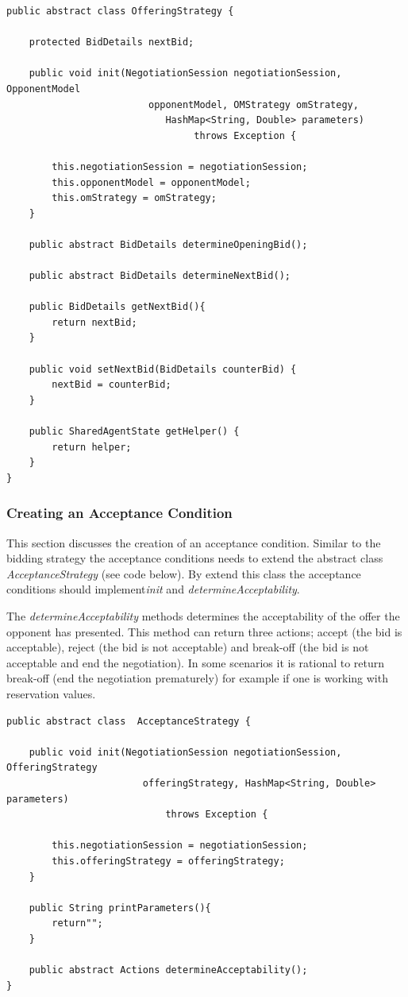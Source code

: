 \documentclass[]{article}
\begin{document}
\begin{lstlisting}
public abstract class OfferingStrategy { 

	protected BidDetails nextBid;

	public void init(NegotiationSession negotiationSession, OpponentModel
						 opponentModel, OMStrategy omStrategy, 
							HashMap<String, Double> parameters)
								 throws Exception {

		this.negotiationSession = negotiationSession;
		this.opponentModel = opponentModel;
		this.omStrategy = omStrategy;
	}
	
	public abstract BidDetails determineOpeningBid();

	public abstract BidDetails determineNextBid();	
	
	public BidDetails getNextBid(){
		return nextBid;
	}
	
	public void setNextBid(BidDetails counterBid) {
		nextBid = counterBid;
	}
	
	public SharedAgentState getHelper() {
		return helper;
	}
}
\end{lstlisting}


\subsubsection{Creating an Acceptance Condition}
This section discusses the creation of an acceptance condition.  Similar to the bidding strategy the acceptance conditions needs to extend the abstract class \textit{AcceptanceStrategy} (see code below).  By extend this class the acceptance conditions should implement\textit{init} and \textit{determineAcceptability}.

The \textit{determineAcceptability} methods determines the acceptability of the offer the opponent has presented.  This method can return three actions; accept (the bid is acceptable), reject (the bid is not acceptable) and break-off (the bid is not acceptable and end the negotiation).  In some scenarios it is rational to return break-off (end the negotiation prematurely) for example if one is working with reservation values.

\begin{lstlisting}
public abstract class  AcceptanceStrategy {

	public void init(NegotiationSession negotiationSession, OfferingStrategy 
						offeringStrategy, HashMap<String, Double> parameters)
							throws Exception {
	
		this.negotiationSession = negotiationSession;
		this.offeringStrategy = offeringStrategy;
	}
	
	public String printParameters(){
		return"";
	}
	
	public abstract Actions determineAcceptability();
}
\end{lstlisting}
\end{document}
